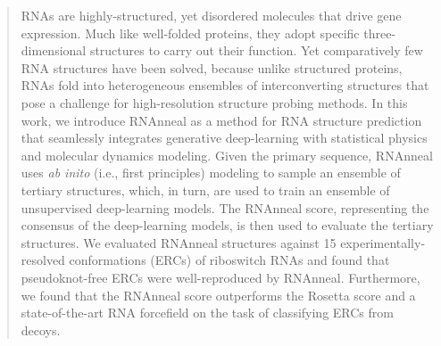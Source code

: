 \documentclass[%
aip,
 amsmath,amssymb,
reprint,%
onecolumn,
]{revtex4-1}
\begin{document}
\begin{abstract}
RNAs are highly-structured, yet disordered molecules that drive gene expression. Much like well-folded proteins, they adopt specific three-dimensional structures to carry out their function. Yet comparatively few RNA structures have been solved, because unlike structured proteins, RNAs fold into heterogeneous ensembles of interconverting structures that pose a challenge for high-resolution structure probing methods. In this work, we introduce RNAnneal as a method for RNA structure prediction that seamlessly integrates generative deep-learning with statistical physics and molecular dynamics modeling. Given the primary sequence, RNAnneal uses {\it ab inito} (i.e., first principles) modeling to sample an ensemble of tertiary structures, which, in turn, are used to train an ensemble of unsupervised deep-learning models. The RNAnneal score, representing the consensus of the deep-learning models, is then used to evaluate the tertiary structures. We evaluated RNAnneal structures against 15 experimentally-resolved conformations (ERCs) of riboswitch RNAs and found that pseudoknot-free ERCs were well-reproduced by RNAnneal. Furthermore, we found that the RNAnneal score outperforms the Rosetta score and a state-of-the-art RNA forcefield on the task of classifying ERCs from decoys.

\end{abstract}

\maketitle

\end{document}
